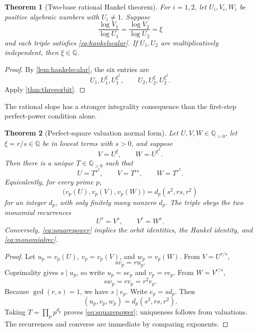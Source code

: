 \documentclass[11pt]{article}
\numberwithin{equation}{section}
\newtheorem{theorem}{Theorem}[section]
\theoremstyle{definition}
\newcommand{\Q}{\mathbb{Q}}
\begin{document}
\begin{theorem}[Two-base rational Hankel theorem]\label{thm:twohankel}
For \(i=1,2\), let \(U_i,V_i,W_i\) be positive algebraic numbers with \(U_i\ne1\). Suppose
\begin{equation}\label{eq:twoslope}
  \frac{\log V_1}{\log U_1}
   =\frac{\log V_2}{\log U_2}=\xi
\end{equation}
and each triple satisfies \eqref{eq:hankelscalar}. If \(U_1,U_2\) are multiplicatively independent, then \(\xi\in\Q\).
\end{theorem}

\begin{proof}
By \cref{lem:hankelscalar}, the six entries are
\[
 U_1,U_1^\xi,U_1^{\xi^2},
 \qquad
 U_2,U_2^\xi,U_2^{\xi^2}.
\]
Apply \cref{thm:threeorbit}.
\end{proof}

The rational slope has a stronger integrality consequence than the first-step perfect-power condition alone.

\begin{theorem}[Perfect-square valuation normal form]\label{thm:squarepattern}
Let \(U,V,W\in\Q_{>0}\), let \(\xi=r/s\in\Q\) be in lowest terms with \(s>0\), and suppose
\[
       V=U^\xi,
       \qquad
       W=U^{\xi^2}.
\]
Then there is a unique \(T\in\Q_{>0}\) such that
\begin{equation}\label{eq:squarepower}
       U=T^{s^2},
       \qquad
       V=T^{rs},
       \qquad
       W=T^{r^2}.
\end{equation}
Equivalently, for every prime \(p\),
\begin{equation}\label{eq:squarevaluations}
  \bigl(v_p(U),v_p(V),v_p(W)\bigr)
      =d_p(s^2,rs,r^2)
\end{equation}
for an integer \(d_p\), with only finitely many nonzero \(d_p\). The triple obeys the two monomial recurrences
\begin{equation}\label{eq:monomialrec}
       U^r=V^s,
       \qquad
       V^r=W^s.
\end{equation}
Conversely, \eqref{eq:squarepower} implies the orbit identities, the Hankel identity, and \eqref{eq:monomialrec}.
\end{theorem}

\begin{proof}
Let \(u_p=v_p(U)\), \(v_p=v_p(V)\), and \(w_p=v_p(W)\). From \(V=U^{r/s}\),
\[
       s v_p=r u_p.
\]
Coprimality gives \(s\mid u_p\), so write \(u_p=s e_p\) and \(v_p=r e_p\). From \(W=V^{r/s}\),
\[
       s w_p=r v_p=r^2e_p.
\]
Because \(\gcd(r,s)=1\), we have \(s\mid e_p\). Write \(e_p=s d_p\). Then
\[
       (u_p,v_p,w_p)=d_p(s^2,rs,r^2).
\]
Taking \(T=\prod_p p^{d_p}\) proves \eqref{eq:squarepower}; uniqueness follows from valuations. The recurrences and converse are immediate by comparing exponents.
\end{proof}
\end{document}
